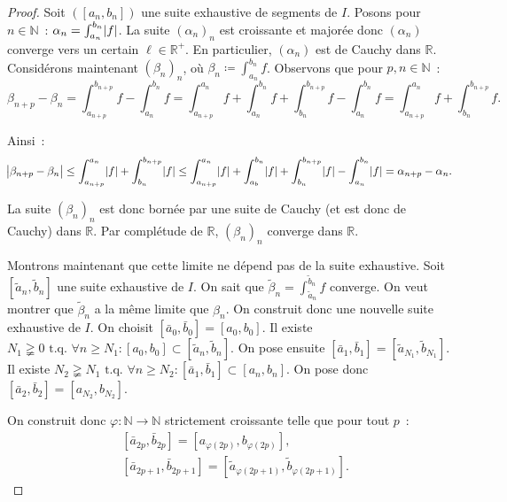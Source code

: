 \documentclass{report}
\theoremstyle{definition}
\theoremstyle{remark}
\numberwithin{equation}{section}
\newcommand{\R}{\mathbb R}
\newcommand{\Rp}{\R^{+}}
\newcommand{\N}{\mathbb N}
\newcommand{\tq}{\text{ t.q. }}
\begin{document}
			\begin{proof} Soit $([a_n, b_n])$ une suite exhaustive de segments de $I$. Posons pour $n \in \N$~: $\alpha_n = \int_{a_n}^{b_n}\abs f$.
			La suite $(\alpha_n)_n$ est croissante et majorée donc $(\alpha_n)$ converge vers un certain $\ell \in \Rp$. En particulier, $(\alpha_n)$ est de
			Cauchy dans $\R$. Considérons maintenant $(\beta_n)_n$, où $\beta_n \coloneqq \int_{a_n}^{b_n}f$. Observons que pour $p, n \in \N$~:
			\begin{equation}
				\beta_{n+p} - \beta_n = \int_{a_{n+p}}^{b_{n+p}}f - \int_{a_n}^{b_n}f
				= \int_{a_{n+p}}^{a_n}f + \int_{a_n}^{b_n}f + \int_{b_n}^{b_{n+p}}f - \int_{a_n}^{b_n}f = \int_{a_{n+p}}^{a_n}f + \int_{b_n}^{b_{n+p}}f.
			\end{equation}

			Ainsi~:
			\begin{equation}
				\abs {\beta_{n+p}-\beta_n} \leq \int_{a_{n+p}}^{a_n}\abs f + \int_{b_n}^{b_{n+p}} \abs f
				\leq \int_{a_{n+p}}^{a_n}\abs f + \int_{a_b}^{b_n} \abs f + \int_{b_n}^{b_{n+p}} \abs f - \int_{a_n}^{b_n}\abs f
				= \alpha_{n+p} - \alpha_n.
			\end{equation}

			La suite $(\beta_n)_n$ est donc bornée par une suite de Cauchy (et est donc de Cauchy) dans $\R$. Par complétude de $\R$, $(\beta_n)_n$ converge
			dans $\R$.

			Montrons maintenant que cette limite ne dépend pas de la suite exhaustive. Soit $[\widetilde a_n, \widetilde b_n]$ une suite exhaustive de $I$. On
			sait que $\widetilde \beta_n = \int_{\widetilde a_n}^{\widetilde b_n} f$ converge. On veut montrer que $\widetilde \beta_n$ a la même limite que
			$\beta_n$. On construit donc une nouvelle suite exhaustive de $I$. On choisit $[\bar a_0, \bar b_0] = [a_0, b_0]$. Il existe
			$N_1 \gneqq 0 \tq \forall n \geq N_1 : [a_0, b_0] \subset [\widetilde a_n, \widetilde b_n]$. On pose ensuite
			$[\bar a_1, \bar b_1] = [\widetilde a_{N_1}, \widetilde b_{N_1}]$. Il existe
			$N_2 \gneqq N_1 \tq \forall n \geq N_2 : [\bar a_1, \bar b_1] \subset [a_n, b_n]$. On pose donc $[\bar a_2, \bar b_2] = [a_{N_2}, b_{N_2}]$.

			On construit donc $\varphi : \N \to \N$ strictement croissante telle que pour tout $p$~:
			\begin{align}
				&[\bar a_{2p}, \bar b_{2p}] = [a_{\varphi(2p)}, b_{\varphi(2p)}], \\
				&[\bar a_{2p+1}, \bar b_{2p+1}] = [\widetilde a_{\varphi(2p+1)}, \widetilde b_{\varphi(2p+1)}].
			\end{align}


\end{proof}
\end{document}

